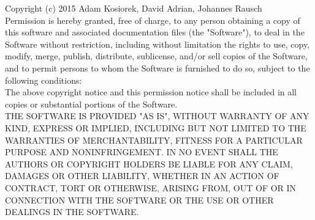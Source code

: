 \documentclass[a4paper,twoside, openright,12pt]{report}
\begin{document}
Copyright (c) 2015 Adam Kosiorek, David Adrian, Johannes Rausch\\

Permission is hereby granted, free of charge, to any person obtaining a copy of this software and associated documentation files (the "Software"), to deal in the Software without restriction, including without limitation the rights to use, copy, modify, merge, publish, distribute, sublicense, and/or sell copies of the Software, and to permit persons to whom the Software is furnished to do so, subject to the following conditions:\\

The above copyright notice and this permission notice shall be included in all copies or substantial portions of the Software.\\

THE SOFTWARE IS PROVIDED "AS IS", WITHOUT WARRANTY OF ANY KIND, EXPRESS OR IMPLIED, INCLUDING BUT NOT LIMITED TO THE WARRANTIES OF MERCHANTABILITY, FITNESS FOR A PARTICULAR PURPOSE AND NONINFRINGEMENT. IN NO EVENT SHALL THE AUTHORS OR COPYRIGHT HOLDERS BE LIABLE FOR ANY CLAIM, DAMAGES OR OTHER LIABILITY, WHETHER IN AN ACTION OF CONTRACT, TORT OR OTHERWISE, ARISING FROM, OUT OF OR IN CONNECTION WITH THE SOFTWARE OR THE USE OR OTHER DEALINGS IN THE SOFTWARE.
\end{document}
